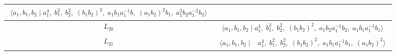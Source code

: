 \documentclass[dvipsnames]{article}
\theoremstyle{definition}
\theoremstyle{remark}
\begin{document}
\begin{longtable}{ |c|c| }
\begin{minipage}{6cm}
        {
        \vspace{-2.5mm}
        \begin{align*}
            \big \langle
            a_1, b_1, b_2 \; \big | \;
            a_1^4, \; b_1^2, \; b_2^2, \; (b_1 b_2)^2, \;
            a_1 b_1 a_1^{-1} b, \; (a_1b_2)^2 b_1,\; a_1^2 b_2 a_1^{-2} b_2
            \big \rangle
        \end{align*}
        \vspace{-5mm}
        }
    \end{minipage}\\
    \hline
    $L_{20}$
    &
    \begin{minipage}{6cm}
        {
        \vspace{-2.5mm}
        \begin{align*}
            \big \langle
            a_1, b_1, b_2 \; \big | \;
            a_1^4, \; b_1^2, \; b_2^2, \; (b_1 b_2)^2, \;
            a_1 b_2 a_1^{-1} b_2, \; a_1 b_1 a_1^{-1} b_1
            \big \rangle
        \end{align*}
        \vspace{-5mm}
        }
    \end{minipage}\\
    \hline
    $L_{21}$
    &
    \begin{minipage}{6cm}
        {
        \vspace{-2.5mm}
        \begin{align*}
            \big \langle
            a_1, b_1, b_2 \; \big | \;&
            a_1^4, \; b_1^2, \; b_2^2, \; (b_1 b_2)^2, \;
            a_1 b_1 a_1^{-1} b_1, \; (a_1 b_2)^2
            \big \rangle
        \end{align*}
        \vspace{-5mm}
        }
    \end{minipage}\\
    \hline
    \end{longtable}
\end{document}
